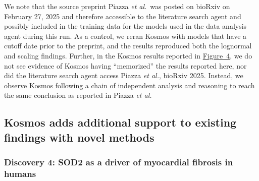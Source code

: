 \documentclass{article}
\begin{document}
We note that the source preprint Piazza \textit{et al.}\ was posted on bioRxiv on February 27, 2025 and therefore accessible to the literature search agent and possibly included in the training data for the models used in the data analysis agent during this run. As a control, we reran Kosmos with models that have a cutoff date prior to the preprint, and the results reproduced both the lognormal and scaling findings. Further, in the Kosmos results reported in \hyperref[fig:fig4]{Figure~4}, we do not see evidence of Kosmos having ``memorized'' the results reported here, nor did the literature search agent access Piazza \textit{et al.}, bioRxiv 2025. Instead, we observe Kosmos following a chain of independent analysis and reasoning to reach the same conclusion as reported in Piazza \textit{et al.}

\subsection{Kosmos adds additional support to existing findings with novel methods}

\subsubsection{Discovery 4: SOD2 as a driver of myocardial fibrosis in humans}
\end{document}
